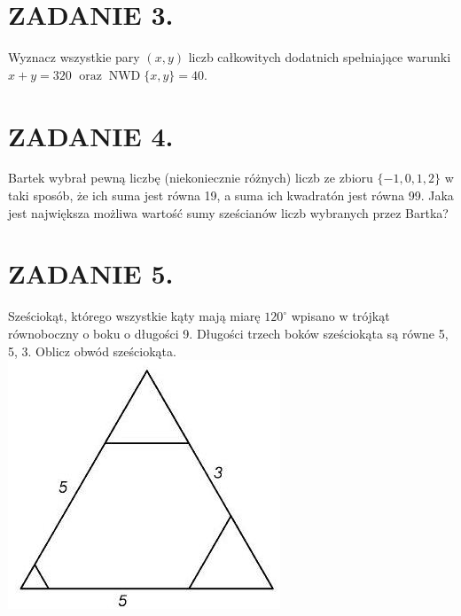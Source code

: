 \documentclass[10pt]{article}
\begin{document}
\section*{ZADANIE 3.}
Wyznacz wszystkie pary \((x, y)\) liczb całkowitych dodatnich spełniające warunki \(x+y=320\) \(\operatorname{oraz} \operatorname{NWD}\{x, y\}=40\).

\section*{ZADANIE 4.}
Bartek wybrał pewną liczbę (niekoniecznie różnych) liczb ze zbioru \(\{-1,0,1,2\}\) w taki sposób, że ich suma jest równa 19, a suma ich kwadratón jest równa 99. Jaka jest największa możliwa wartość sumy sześcianów liczb wybranych przez Bartka?

\section*{ZADANIE 5.}
Sześciokąt, którego wszystkie kąty mają miarę \(120^{\circ}\) wpisano w trójkąt równoboczny o boku o długości 9. Długości trzech boków sześciokąta są równe 5, 5, 3. Oblicz obwód sześciokąta.\\
\includegraphics[max width=\textwidth, center]{2024_11_21_943a59a868dc10504530g-1(1)}
\end{document}
